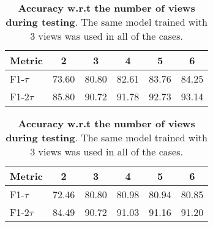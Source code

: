 \begin{table}[ht]
\noindent \scriptsize \footnotesize
\begin{minipage}[t]{0.5\textwidth}
\centering
\begin{tabular}{ l | c c c c c }
    \hline
    Metric & 2 & 3 & 4 & 5 & 6\\
    \hline
    F1-$\tau$  & 73.60 & 80.80 & 82.61 & 83.76 & 84.25 \\
    F1-$2\tau$ & 85.80 & 90.72 & 91.78 & 92.73 & 93.14 \\
    \hline
\end{tabular}
\caption{
    \textbf{Accuracy w.r.t the number of views during training}.
    The evaluation was performed on the same number of views as training.
}
\label{table:number_of_input_views}
\end{minipage}
\hspace{0.1cm}
\noindent \scriptsize \footnotesize
\begin{minipage}[t]{0.5\textwidth}
\centering
\begin{tabular}{ l | c c c c c }
    \hline
    Metric & 2 & 3 & 4 & 5 & 6 \\
    \hline
    F1-$\tau$   & 72.46 & 80.80 & 80.98 & 80.94 & 80.85 \\
    F1-$2\tau$  & 84.49 & 90.72 & 91.03 & 91.16 & 91.20 \\
    \hline
\end{tabular}
\caption{
    \textbf{Accuracy w.r.t the number of views during testing}.
    The same model trained with 3 views was used in all of the cases.
}
\label{table:number_of_test_views}
\end{minipage}
\vspace{-4mm}
\end{table}
\vspace{-4mm}
